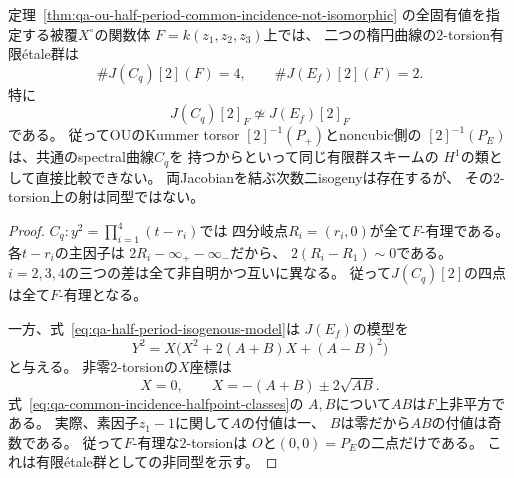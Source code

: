 \begin{proposition}[共通incidenceの二torsorの作用群も異なる]
\label{prop:qa-ou-half-common-incidence-groups-distinct}
定理~\ref{thm:qa-ou-half-period-common-incidence-not-isomorphic}
の全固有値を指定する被覆$X^\circ$の関数体
$F=k(z_1,z_2,z_3)$上では、
二つの楕円曲線の$2$-torsion有限\'{e}tale群は
\begin{equation}
 \#J(C_q)[2](F)=4,\qquad
 \#J(E_f)[2](F)=2 .
 \label{eq:qa-ou-half-two-torsion-groups}
\end{equation}
特に
\[
 J(C_q)[2]_F\not\simeq J(E_f)[2]_F
\]
である。
従ってOUのKummer torsor
$[2]^{-1}(P_+)$とnoncubic側の
$[2]^{-1}(P_E)$は、共通のspectral曲線$C_q$を
持つからといって同じ有限群スキームの
$H^1$の類として直接比較できない。
両Jacobianを結ぶ次数二isogenyは存在するが、
その$2$-torsion上の射は同型ではない。
\end{proposition}
\begin{proof}
$C_q:y^2=\prod_{i=1}^4(t-r_i)$では
四分岐点$R_i=(r_i,0)$が全て$F$-有理である。
各$t-r_i$の主因子は
$2R_i-\infty_+-\infty_-$だから、
$2(R_i-R_1)\sim0$である。
$i=2,3,4$の三つの差は全て非自明かつ互いに異なる。
従って$J(C_q)[2]$の四点は全て$F$-有理となる。

一方、式~\eqref{eq:qa-half-period-isogenous-model}は
$J(E_f)$の模型を
\[
 Y^2=X\bigl(X^2+2(A+B)X+(A-B)^2\bigr)
\]
と与える。
非零$2$-torsionの$X$座標は
\[
 X=0,\qquad X=-(A+B)\pm2\sqrt{AB}.
\]
式~\eqref{eq:qa-common-incidence-halfpoint-classes}の
$A,B$について$AB$は$F$上非平方である。
実際、素因子$z_1-1$に関して$A$の付値は一、
$B$は零だから$AB$の付値は奇数である。
従って$F$-有理な$2$-torsionは
$O$と$(0,0)=P_E$の二点だけである。
これは有限\'{e}tale群としての非同型を示す。
\end{proof}

